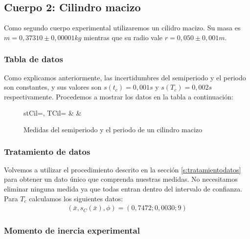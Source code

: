 \documentclass[12pt, a4paper, titlepage]{article}
\begin{document}
  \newpage
  \subsection{Cuerpo 2: Cilindro macizo}

  Como segundo cuerpo experimental utilizaremos un cilidro macizo. Su masa es $m = 0,37310 \pm 0,00001 kg$ mientras que su radio vale $r = 0,050 \pm 0,001 m$.

  \subsubsection{Tabla de datos}

  Como explicamos anteriormente, las incertidumbres del semiperiodo y el periodo son constantes, y sus valores son $s(t_c) = 0,001s$ y $s(T_c) = 0,002s$ respectivamente. Procedemos a mostrar los datos en la tabla a continuación:

  \begin{figure}[H]
    \begin{table}[H]
      \centering
        {stCil=\semiperiodo, TCil=\periodo}
        {\thecsvrow & \semiperiodo & \periodo}
    \end{table}
    \caption{Medidas del semiperiodo y el periodo de un cilindro macizo}
  \end{figure}

  \subsubsection{Tratamiento de datos}

  Volvemos a utilizar el procedimiento descrito en la sección \ref{s:tratamientodatos} para obtener un dato único que comprenda nuestras medidas. No necesitamos eliminar ninguna medida ya que todas entran dentro del intervalo de confianza. Para $T_c$ calculamos los siguientes datos:
  \begin{gather*}
    (\bar{x}, s_C(\bar{x}), \phi) = (0,7472;0,0030;9)
  \end{gather*}

  \subsubsection{Momento de inercia experimental}
\end{document}
